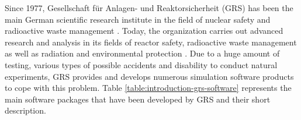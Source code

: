 Since 1977, Gesellschaft für Anlagen- und Reaktorsicherheit (GRS) has been the main German scientific research institute in the field of nuclear safety and radioactive waste management \cite{grs:grs-general-info}. Today, the organization carries out advanced research and analysis in its fields of reactor safety, radioactive waste management as well as radiation and environmental protection \cite{grs:grs-general-info}. Due to a huge amount of testing, various types of possible accidents and disability to conduct natural experiments, GRS provides and develops numerous simulation software products to cope with this problem. Table \ref{table:introduction-grs-software} represents the main software packages that have been developed by GRS and their short description.\\

